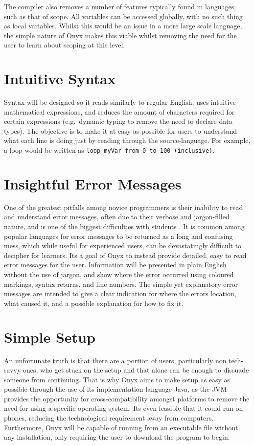 \documentclass[
]{report}
\begin{document}
The compiler also removes a number of features typically found in
languages, such as that of scope. All variables can be accessed
globally, with no such thing as local variables. Whilst this would be an
issue in a more large scale language, the simple nature of Onyx makes
this viable whilst removing the need for the user to learn about scoping
at this level.

\section{Intuitive Syntax}
Syntax will be designed so it reads similarly to regular English, uses
intuitive mathematical \glspl{expression}, and reduces the amount of characters
required for certain \glspl{expression} (e.g.~dynamic typing to remove the need
to declare data types). The objective is to make it at easy as possible
for users to understand what each line is doing just by reading through
the \gls{source-language}. For example, a loop would be written as
\texttt{loop\ myVar\ from\ 0\ to\ 100\ (inclusive)}.

\section{Insightful Error Messages}
One of the greatest pitfalls among novice programmers is their inability
to read and understand error messages, often due to their verbose and
jargon-filled nature, and is one of the biggest difficulties with
students \cite{pedagogical-report}. It is common among popular languages for error
messages to be returned as a long and confusing mess, which while useful
for experienced users, can be devastatingly difficult to decipher for
learners. Its a goal of Onyx to instead provide detailed, easy to read
error messages for the user. Information will be presented in plain
English without the use of jargon, and show where the error occurred
using coloured markings, syntax returns, and line numbers. The simple
yet explanatory error messages are intended to give a clear indication
for where the errors location, what caused it, and a possible
explanation for how to fix it.

\section{Simple Setup}
An unfortunate truth is that there are a portion of users, particularly
non tech-savvy ones, who get stuck on the setup and that alone can be
enough to dissuade someone from continuing. That is why Onyx aims to
make setup as easy as possible through the use of its \gls{implementation-language} Java, 
as the JVM provides the opportunity for cross-compatibility amongst platforms to
remove the need for using a specific operating system. Its even feasible
that it could run on phones, reducing the technological requirement away
from computers. Furthermore, Onyx will be capable of running from an
executable file without any installation, only requiring the user to
download the program to begin.
\end{document}

